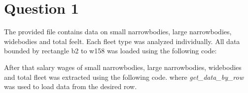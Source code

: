\section{Question 1}
The provided file contains data on small narrowbodies, large narrowbodies, widebodies and total feelt. Each fleet
type was analyzed individually. All data bounded by rectangle b2 to w158 was loaded using the following code:


After that salary wages of small narrowbodies, large narrowbodies, widebodies and total fleet was extracted using the following code. where \textit{get\_data\_by\_row} was used to load data from the desired row.








